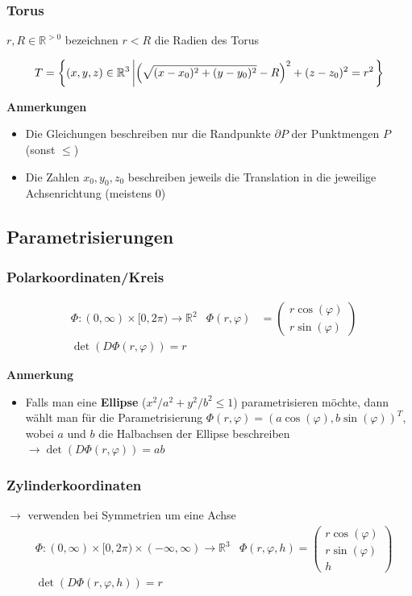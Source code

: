 \documentclass[8pt, a4paper, landscape, fleqn]{scrartcl}
\newenvironment {annotation}[1]
				{\begin{itshape} \begin{small} \textbf{#1} \begin{itemize}}
				{\end{itemize} \end{small} \end{itshape}}
\begin{document}
\begin{multicols*}{3}
				\subsubsection{Torus}
					$r, R \in \mathbb{R}^{>0}$ bezeichnen $r<R$ die Radien des Torus
					\begin{small}
						\[T=\left\{(x, y, z)\in \mathbb{R}^3 \large \left \vert  \left( \sqrt{(x-x_0)^2+(y-y_0)^2}-R\right)^2 +(z-z_0)^2=r^2 \right. \right\}\]
					\end{small}	
					\begin{annotation}{Anmerkungen}
						\item[i)] Die Gleichungen beschreiben nur die Randpunkte $\partial P$ der Punktmengen $P$ (sonst $\le$)
						\item[ii)] Die Zahlen $x_0, y_0, z_0$ beschreiben jeweils die Translation in die jeweilige Achsenrichtung (meistens 0)
					\end{annotation}	
			\subsection{Parametrisierungen}	
				\label{sec:param}
				\subsubsection{Polarkoordinaten/Kreis}
					\vspace{-7pt}
					\begin{align*}
						&\Phi: (0, \infty)\times [0, 2\pi) \rightarrow \mathbb{R}^2 & \Phi(r, \varphi)&=
						\begin{pmatrix}
							r\cos(\varphi)\\ r\sin(\varphi)
						\end{pmatrix}\\
						&\det (D\Phi (r, \varphi))=r 
					\end{align*}
					\begin{annotation}{Anmerkung}
						\item[i)] Falls man eine \textbf{Ellipse} ($x^2/a^2+y^2/b^2\leq 1$) parametrisieren möchte, dann wählt man für die Parametrisierung $\Phi(r,\varphi) = (a\cos(\varphi), b\sin(\varphi))^T$, wobei $a$ und $b$ die Halbachsen der Ellipse beschreiben 
						$\to \det (D\Phi (r, \varphi))=ab$
					\end{annotation}
				\subsubsection{Zylinderkoordinaten}
				    $\rightarrow$ verwenden bei Symmetrien um eine Achse
					\vspace{-7pt}
					\begin{align*}
						&\Phi: (0, \infty)\times [0, 2\pi)\times (-\infty, \infty) \rightarrow \mathbb{R}^3 & \Phi(r, \varphi, h)=
						\begin{pmatrix}
							r\cos(\varphi)\\ r\sin(\varphi)\\ h
						\end{pmatrix}\\
						&\det (D\Phi (r, \varphi, h))=r
					\end{align*}

\end{multicols*}
\end{document}

